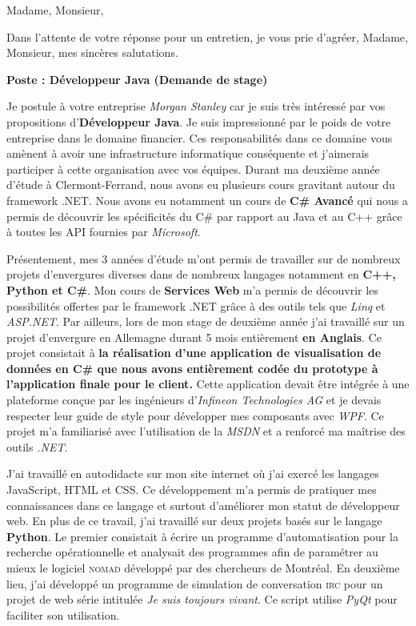 \date{\today}
\opening{Madame, Monsieur,}
\closing{Dans l'attente de votre réponse pour un entretien, je vous prie d'agréer, Madame, Monsieur, mes sincères salutations.}

\makelettertitle

\textbf{Poste : Développeur Java (Demande de stage)}

\introduction{}
Je postule à votre entreprise \textit{Morgan Stanley} car je suis très intéressé par vos propositions d'\textbf{Développeur Java}. Je suis impressionné par le poids de votre entreprise dans le domaine financier. Ces responsabilités dans ce domaine vous amènent à avoir une infrastructure informatique conséquente et j'aimerais participer à cette organisation avec vos équipes. Durant ma deuxième année d'étude à Clermont-Ferrand, nous avons eu plusieurs cours gravitant autour du framework .NET. Nous avons eu notamment un cours de \textbf{C\# Avancé} qui nous a permis de découvrir les spécificités du C\# par rapport au Java et au C++ grâce à toutes les API fournies par \textit{Microsoft}.

Présentement, mes 3 années d'étude m'ont permis de travailler sur de nombreux projets d'envergures diverses dans de nombreux langages notamment en \textbf{C++, Python et C\#}. Mon cours de \textbf{Services Web} m'a permis de découvrir les possibilités offertes par le framework .NET grâce à des outils tels que \textit{Linq} et \textit{ASP.NET}. Par ailleurs, lors de mon stage de deuxième année j'ai travaillé sur un projet d'envergure en Allemagne durant 5 mois entièrement \textbf{en Anglais}. Ce projet consistait à \textbf{la réalisation d'une application de visualisation de données en C\# que nous avons entièrement codée du prototype à l'application finale pour le client.} Cette application devait être intégrée à une plateforme conçue par les ingénieurs d'\textit{Infineon Technologies AG} et je devais respecter leur guide de style pour développer mes composants avec \textit{WPF}. Ce projet m'a familiarisé avec l'utilisation de la \textit{MSDN} et a renforcé ma maîtrise des outils \textit{.NET}.

J'ai travaillé en autodidacte sur mon site internet où j'ai exercé les langages JavaScript, HTML et CSS. Ce développement m'a permis de pratiquer mes connaissances dans ce langage et surtout d'améliorer mon statut de développeur web. En plus de ce travail, j'ai travaillé sur deux projets basés sur le langage \textbf{Python}. Le premier consistait à écrire un programme d'automatisation pour la recherche opérationnelle et analysait des programmes afin de paramétrer au mieux le logiciel \textsc{nomad} développé par des chercheurs de Montréal. En deuxième lieu, j'ai développé un programme de simulation de conversation \textsc{irc} pour un projet de web série intitulée \textit{Je suis toujours vivant}. Ce script utilise \textit{PyQt} pour faciliter son utilisation. \conclusion{}

\makeletterclosing
